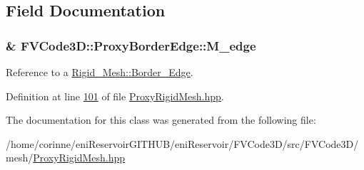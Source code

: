 \subsection{Field Documentation}
\subsubsection[{\texorpdfstring{M\+\_\+edge}{M_edge}}]{\& F\+V\+Code3\+D\+::\+Proxy\+Border\+Edge\+::\+M\+\_\+edge\hspace{0.3cm}{\ttfamily [private]}}\hypertarget{classFVCode3D_1_1ProxyBorderEdge_ad4337ca6acca8e9535e61f899f2fe3f6}{}\label{classFVCode3D_1_1ProxyBorderEdge_ad4337ca6acca8e9535e61f899f2fe3f6}


Reference to a \hyperlink{classFVCode3D_1_1Rigid__Mesh_1_1Border__Edge}{Rigid\+\_\+\+Mesh\+::\+Border\+\_\+\+Edge}. 



Definition at line \hyperlink{ProxyRigidMesh_8hpp_source_l00101}{101} of file \hyperlink{ProxyRigidMesh_8hpp_source}{Proxy\+Rigid\+Mesh.\+hpp}.



The documentation for this class was generated from the following file\+:\begin{DoxyCompactItemize}
\item 
/home/corinne/eni\+Reservoir\+G\+I\+T\+H\+U\+B/eni\+Reservoir/\+F\+V\+Code3\+D/src/\+F\+V\+Code3\+D/mesh/\hyperlink{ProxyRigidMesh_8hpp}{Proxy\+Rigid\+Mesh.\+hpp}\end{DoxyCompactItemize}
